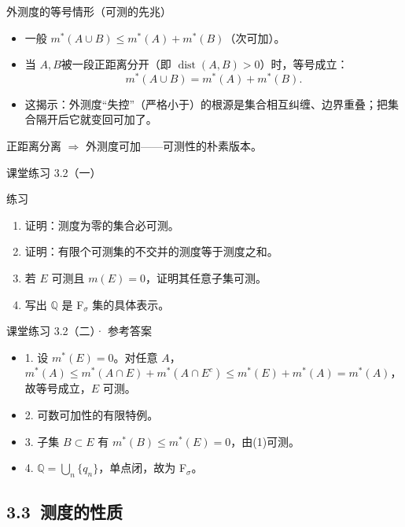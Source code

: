 \documentclass[aspectratio=169,11pt]{ctexbeamer}
\begin{document}
\begin{frame}{外测度的等号情形（可测的先兆）}
  \begin{itemize}
    \item 一般 $m^{*}(A\cup B)\le m^{*}(A)+m^{*}(B)$（次可加）。
    \item 当 $A,B$\alert{被一段正距离分开}（即 $\operatorname{dist}(A,B)>0$）时，等号成立：
    \[ m^{*}(A\cup B)=m^{*}(A)+m^{*}(B). \]
    \item 这揭示：外测度“失控”（严格小于）的根源是集合\alert{相互纠缠、边界重叠}；把集合隔开后它就变回可加了。
  \end{itemize}
  \begin{center}
    \color{cloudgray}\small 正距离分离 $\Rightarrow$ 外测度可加——可测性的朴素版本。
  \end{center}
\end{frame}

\begin{frame}{课堂练习 3.2（一）}
  \begin{block}{练习}
    \begin{enumerate}
      \item 证明：测度为零的集合必可测。
      \item 证明：有限个可测集的不交并的测度等于测度之和。
      \item 若 $E$ 可测且 $m(E)=0$，证明其任意子集可测。
      \item 写出 $\mathbb{Q}$ 是 F$_\sigma$ 集的具体表示。
    \end{enumerate}
  \end{block}
\end{frame}

\begin{frame}{课堂练习 3.2（二）· 参考答案}
  \begin{itemize}
    \item 1. 设 $m^{*}(E)=0$。对任意 $A$，$m^{*}(A)\le m^{*}(A\cap E)+m^{*}(A\cap E^{c})\le m^{*}(E)+m^{*}(A)=m^{*}(A)$，故等号成立，$E$ 可测。
    \item 2. 可数可加性的有限特例。
    \item 3. 子集 $B\subset E$ 有 $m^{*}(B)\le m^{*}(E)=0$，由(1)可测。
    \item 4. $\mathbb{Q}=\bigcup_{n}\{q_n\}$，单点闭，故为 F$_\sigma$。
  \end{itemize}
\end{frame}

\subsection{3.3\ 测度的性质}
\end{document}
